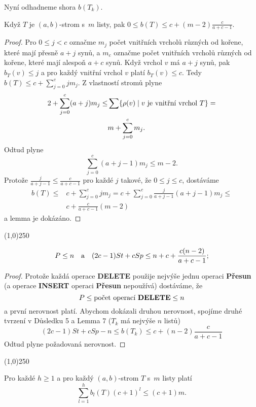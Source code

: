 \documentclass[a4paper,12pt]{article}
\newenvironment{myproof}{
  \begin{proof}
    
  }{
  \end{proof}
  \begin{center}
   \line(1,0){250}
   \end{center}
  }
\begin{document}
Nyní odhadneme shora $b(T_k)$.

\begin{lemma_counting}Když $T$ je $(a,b)$-strom s~$m$ listy, pak 
$0\le b(T)\le c+(m-2)\frac c{a+c-1}$.
\end{lemma_counting}

\begin{myproof}Pro $0\le j<c$ označme $m_j$ počet 
vnitřních vrcholů různých od kořene, 
které mají přesně $a+j$ synů, a $m_c$ označme 
počet vnitřních vrcholů různých od 
kořene, které mají alespoň $a+c$ synů. Když 
vrchol $v$ má $a+j$ synů, pak $b_T(v)\le j$ a pro 
každý vnitřní vrchol $v$ platí $b_T(v)\le c$. Tedy 
$b(T)\le c+\sum_{j=0}^cjm_j$. Z vlastností stromů plyne 
\begin{align*}2+\sum_{j=0}^c(a+j)m_j\le&\sum \{\rho (v)\mid v\text{\rm\ je vnitřní vrchol }
T\}=\\
&m+\sum_{j=0}^cm_j.\end{align*}
Odtud plyne
$$\sum_{j=0}^c(a+j-1)m_j\le m-2.$$
Protože $\frac j{a+j-1}\le\frac c{a+c-1}$ pro každé $j$ takové, že $
0\le j\le c$, 
dostáváme
\begin{align*} b(T)\le&c+\sum_{j=0}^cjm_j=c+\sum_{j=0}^c\frac j{a+j-1}(
a+j-1)m_j\le\\
&c+\frac c{a+c-1}(m-2)\end{align*}
a lemma je dokázáno.
\end{myproof}

\begin{veta}[1]
    $$P\le n\quad \text{\rm a}\quad (2c-1)St+cSp\le n+c+\frac {c(n-2)}{a+c-1};$$
\end{veta}

\begin{myproof}
    Protože každá operace 
    {\bf DE\-LETE} použije nejvýše jednu operaci {\bf Přesun} (a operace 
    {\bf INSERT} operaci {\bf Přesun} nepoužívá) dostáváme, že 
    $$P\le\text{\rm počet operací {\bf DELETE}}\le n$$
    a první nerovnost platí. 
    Abychom dokázali druhou nerovnost, spojíme druhé 
    tvrzení v Důsledku 5 a Lemma 7 ($T_k$ má nejvýše 
    $n$ listů) 
    $$(2c-1)St+cSp-n\le b(T_k)\le c+(n-2)\frac c{a+c-1}$$
    Odtud plyne požadovaná nerovnost.
\end{myproof}    

\begin{lemma_counting}Pro každé $h\ge 1$ a pro každý 
$(a,b)$-strom $T$ s~$m$ listy platí 
$$\sum_{l=1}^hb_l(T)(c+1)^l\le (c+1)m.$$
\end{lemma_counting}
\end{document}
